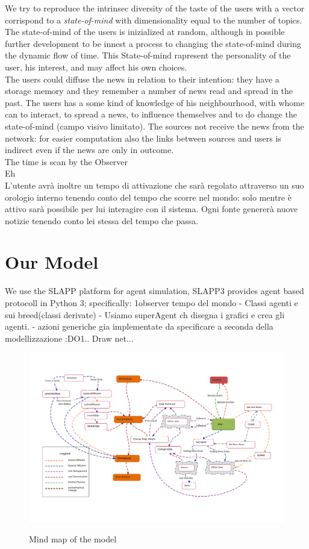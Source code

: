 \documentclass[11pt]{article} %
\begin{document}
We try to reproduce the intrinsec diversity of the taste of the users with a vector corrispond to a {\itshape state-of-mind} with dimensionality equal to the number of topics. The state-of-mind of the users is inizialized at random, although in possible further development to be innest a process to changing the state-of-mind during the dynamic flow of time. This State-of-mind rapresent the personality of the user, his interest, and may affect his own choices.
\\
The users could diffuse the news in relation to their intention: they have a storage memory and they remember a number of news read and spread in the past.
The users has a some kind of knowledge of his neighbourhood, with whome can to interact, to spread a news, to influence themselves and to do change the state-of-mind (campo visivo limitato). The sources not receive the news from the network: for easier computation also the links between sources and users is indirect even if the news are only in outcome.
\\
The time is scan by the Observer\\
Eh
\\
L’utente avrà inoltre un tempo di attivazione che sarà regolato attraverso un suo orologio interno
tenendo conto del tempo che scorre nel mondo: solo mentre è attivo sarà possibile per lui interagire
con il sistema. 
Ogni fonte genererà nuove notizie tenendo conto lei stessa del
tempo che passa.


\section{Our Model}
We use the SLAPP platform for agent simulation,
SLAPP3 provides agent based protocoll in Python 3; specifically: 1observer tempo del mondo - Classi agenti e sui breed(classi derivate) - Usiamo superAgent ch disegna i grafici e crea gli agenti. - azioni generiche gia implementate da specificare a seconda della modellizzazione :DO1.. Draw net... 
\\
\begin{figure}[htpb]
  \centering
  \includegraphics[width=\columnwidth]{mindMap.pdf}
  \label{fig:mindmap}
  \caption{Mind map of the model}
\end{figure}
\end{document}
